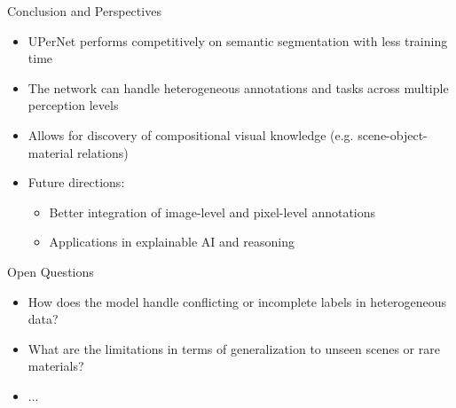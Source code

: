\documentclass{beamer}
\newcommand{\new}[1]{{\color{red}#1}}
\begin{document}
\begin{frame}{Conclusion and Perspectives}
  \begin{itemize}
    \item UPerNet performs competitively on semantic segmentation with less training time
    \item The network can handle heterogeneous annotations and tasks across multiple perception levels
    \item Allows for discovery of compositional visual knowledge (e.g. scene-object-material relations)
    \item Future directions:
    \begin{itemize}
      \item Better integration of image-level and pixel-level annotations
      \item Applications in explainable AI and reasoning
    \end{itemize}
  \end{itemize}
\end{frame}

\begin{frame}{\new{Open Questions}}
  \begin{itemize}
    \item How does the model handle conflicting or incomplete labels in heterogeneous data?
    \item What are the limitations in terms of generalization to unseen scenes or rare materials?
    \item \new{...}
  \end{itemize}
\end{frame}
\end{document}
